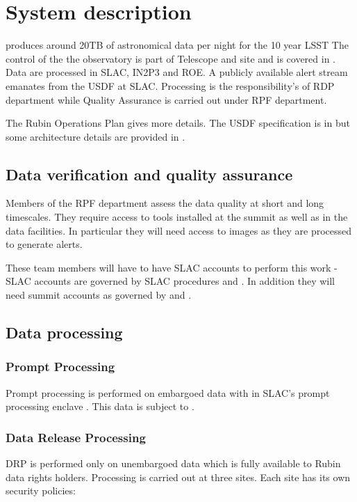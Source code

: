 \section{System description} \label{sec:desc}

\VRO produces around 20TB of astronomical data per night for the 10 year \gls{LSST}
The control of the the observatory is part of Telescope and site and is covered in .
Data are processed in \gls{SLAC}, \gls{IN2P3} and \gls{ROE}.
A publicly available alert stream emanates from the \gls{USDF} at \gls{SLAC}.
Processing is the responsibility's of \gls{RDP} department while \gls{Quality Assurance} is carried out under \gls{RPF} department.

The Rubin \gls{Operations} Plan  gives more details.
The \gls{USDF} specification is in  but some architecture details are provided in .






\subsection{Data verification and quality assurance }
Members of the \gls{RPF} department assess the data quality at short and long timescales.
They require access to tools installed at the summit as well as in the data facilities.
In particular they will need access to images as they are processed to generate alerts.

These team members will have to have \gls{SLAC} accounts to perform this work - \gls{SLAC} accounts are governed by SLAC procedures \cite{SLACOB} and \cite{SLACNH}.
In addition they will need summit accounts as governed by  and .



\subsection{Data processing}
\subsubsection{Prompt  Processing}
Prompt processing is performed on embargoed data with in SLAC's prompt processing enclave .
This data is subject to \citep{ACP}.

\subsubsection{Data Release Processing}
DRP is performed only on unembargoed data which is fully available to Rubin data rights holders.
Processing is carried out at three sites.
Each site has its own security policies:

